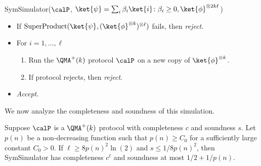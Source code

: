 \begin{algorithm}[H]{SymSimulator}{($\calP$, $\ket{\psi} = \sum_i \beta_i \ket{i} \colon \beta_i \ge 0, \ket{\phi}^{\otimes 2 k \ell}$)}
     \begin{itemize}
       \item If $\textup{SuperProduct}(\ket{\psi},(\ket{\phi}^{\otimes k})^{\otimes \ell})$ fails, then \emph{reject}.
       \item For $i=1,\ldots,\ell$ \begin{enumerate}
          \item Run the $\QMA^+(k)$ protocol $\calP$ on a new copy of $\ket{\phi}^{\otimes k}$.
          \item If protocol rejects, then \emph{reject}.
       \end{enumerate}
       \item \emph{Accept}.
     \end{itemize}
     \caption{Symmetric Simulator}\label{proc:sym_protocol}
\end{algorithm}

We now analyze the completeness and soundness of this simulation.

\begin{lemma}\label{lem:sym_simulator}
  Suppose $\calP$ is a $\QMA^+(k)$ protocol with completeness $c$ and soundness $s$.
  Let $p(n)$ be a non-decreasing function such that $p(n) \ge C_0$ for a sufficiently large
  constant $C_0 > 0$. If $\ell \ge 8 p(n)^2 \ln(2)$ and $s \le 1/8p(n)^2$, then 
  SymSimulator has completeness $c^\ell$ and soundness at most $1/2 + 1/p(n)$.
\end{lemma}

